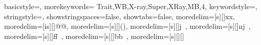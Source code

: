 \usepackage{listings}
\usepackage{subfiles}
\usepackage{textcomp}
\usepackage{xcolor}
\usepackage[ampersand]{easylist}

{
  basicstyle=\ttfamily,
  morekeywords={
  Trait,WB,X-ray,Super,XRay,MB,4},
  keywordstyle=\color{red},
  stringstyle=\color{red},
  showstringspaces=false,
  showtabs=false,
  moredelim=[s][\color{blue}]{x}{x},
  moredelim=[is][\color{violet}]{@}{@},
  moredelim=[s][\color{teal}]{(}{)},
  moredelim=[s][\color{gray}]{j}{\ },
  moredelim=[s][\color{gray}]{nj}{\ },
  moredelim=[s][\color{green}]{ff}{\ },
moredelim=[s][\color{green}]{bb}{\ },
moredelim=[s][\color{teal}]{[}{]}
}